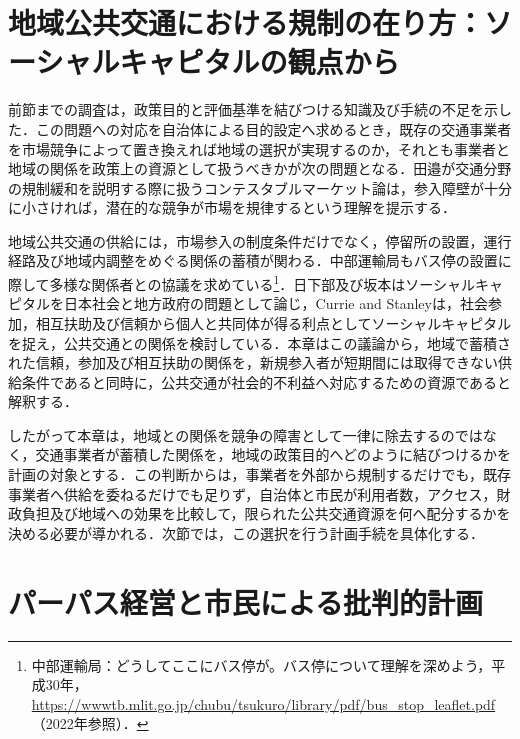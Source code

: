\section{地域公共交通における規制の在り方：ソーシャルキャピタルの観点から}
\label{sec:ch5_social_capital}

前節までの調査は，政策目的と評価基準を結びつける知識及び手続の不足を示した．この問題への対応を自治体による目的設定へ求めるとき，既存の交通事業者を市場競争によって置き換えれば地域の選択が実現するのか，それとも事業者と地域の関係を政策上の資源として扱うべきかが次の問題となる．田邉\cite{tanabe2017}が交通分野の規制緩和を説明する際に扱うコンテスタブルマーケット論は，参入障壁が十分に小さければ，潜在的な競争が市場を規律するという理解を提示する．

地域公共交通の供給には，市場参入の制度条件だけでなく，停留所の設置，運行経路及び地域内調整をめぐる関係の蓄積が関わる．中部運輸局もバス停の設置に際して多様な関係者との協議を求めている\footnote{中部運輸局：どうしてここにバス停が。バス停について理解を深めよう，平成30年，\url{https://wwwtb.mlit.go.jp/chubu/tsukuro/library/pdf/bus_stop_leaflet.pdf}（2022年参照）．}．日下部及び坂本はソーシャルキャピタルを日本社会と地方政府の問題として論じ，Currie and Stanleyは，社会参加，相互扶助及び信頼から個人と共同体が得る利点としてソーシャルキャピタルを捉え，公共交通との関係を検討している\cite{kusatabe2015,sakamoto2005,currie2008}．本章はこの議論から，地域で蓄積された信頼，参加及び相互扶助の関係を，新規参入者が短期間には取得できない供給条件であると同時に，公共交通が社会的不利益へ対応するための資源であると解釈する．

したがって本章は，地域との関係を競争の障害として一律に除去するのではなく，交通事業者が蓄積した関係を，地域の政策目的へどのように結びつけるかを計画の対象とする．この判断からは，事業者を外部から規制するだけでも，既存事業者へ供給を委ねるだけでも足りず，自治体と市民が利用者数，アクセス，財政負担及び地域への効果を比較して，限られた公共交通資源を何へ配分するかを決める必要が導かれる．次節では，この選択を行う計画手続を具体化する．

\section{パーパス経営と市民による批判的計画}
\label{sec:ch5_purpose}

